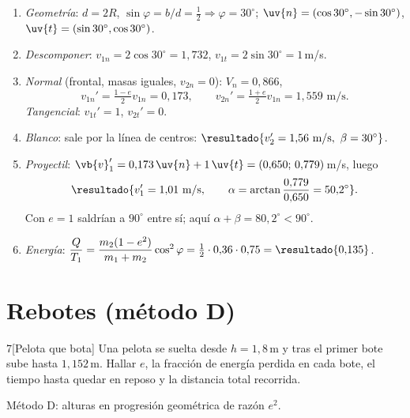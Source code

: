 \documentclass[11pt,a4paper,twoside]{article}
\newcommand{\metodo}[1]{{\color{tenue}\small\sffamily #1}\par\nopagebreak}
\begin{document}
\begin{resolucion}
\begin{enumerate}
  \item \emph{Geometría}: $d=2R$, $\sin\varphi=b/d=\tfrac12\Rightarrow\varphi=30^{\circ}$;
        $\uv{n}=(\cos30^{\circ},-\sin30^{\circ})$, $\uv{t}=(\sin30^{\circ},\cos30^{\circ})$.
  \item \emph{Descomponer}: $v_{1n}=2\cos30^{\circ}=1{,}732$, $v_{1t}=2\sin30^{\circ}=1$\,m/s.
  \item \emph{Normal} (frontal, masas iguales, $v_{2n}=0$): $V_{n}=0{,}866$,
        \[
          v_{1n}'=\tfrac{1-e}{2}v_{1n}=0{,}173,\qquad v_{2n}'=\tfrac{1+e}{2}v_{1n}=1{,}559\text{ m/s}.
        \]
        \emph{Tangencial}: $v_{1t}'=1$, $v_{2t}'=0$.
  \item \emph{Blanco}: sale por la línea de centros: $\resultado{v_{2}'=1{,}56\text{ m/s},\ \beta=30^{\circ}}$.
  \item \emph{Proyectil}: $\vb{v}_{1}'=0{,}173\,\uv{n}+1\,\uv{t}=(0{,}650;\,0{,}779)$\,m/s, luego
        \[
          \resultado{v_{1}'=1{,}01\text{ m/s},\qquad \alpha=\arctan\frac{0{,}779}{0{,}650}=50{,}2^{\circ}} .
        \]
        Con $e=1$ saldrían a $90^{\circ}$ entre sí; aquí $\alpha+\beta=80{,}2^{\circ}<90^{\circ}$.
  \item \emph{Energía}: $\dfrac{Q}{T_{1}}=\dfrac{m_{2}(1-e^{2})}{m_{1}+m_{2}}\cos^{2}\varphi=\tfrac12\cdot0{,}36\cdot0{,}75=\resultado{0{,}135}$.
\end{enumerate}
\end{resolucion}

\section{Rebotes (método D)}

\begin{problema}{7}[Pelota que bota]
Una pelota se suelta desde $h=1{,}8$\,m y tras el primer bote sube hasta $1{,}152$\,m. Hallar $e$, la
fracción de energía perdida en cada bote, el tiempo hasta quedar en reposo y la distancia total recorrida.
\end{problema}
\metodo{Método D: alturas en progresión geométrica de razón $e^{2}$.}
\end{document}
